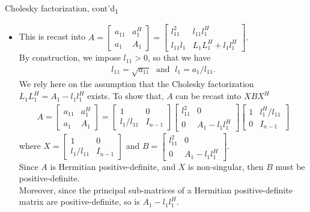 \documentclass[t,usepdftitle=false]{beamer}
\begin{document}
\begin{frame}{Cholesky factorization, cont'd\textsubscript{1}}
\begin{itemize}
\vspace{.1cm}
\item[] This is recast into 
$\displaystyle A=
\begin{bmatrix}
a_{11}&a_1^H\\
a_1&A_1
\end{bmatrix}
=
\begin{bmatrix}
l_{11}^2&l_{11}l_1^H\\
l_{11}l_1&L_1L_1^H+l_1l_1^H
\end{bmatrix}.$\vspace{.2cm}\\
By construction, we impose $l_{11}>0$, so that we have 
\begin{align*}
l_{11}=\sqrt{a_{11}}
\;\text{ and }\;l_1=a_1/l_{11}.
\end{align*}
We rely here on the assumption that the Cholesky factorization $\displaystyle L_1L_1^H=A_1-l_1l_1^H$ exists.
To show that, $A$ can be recast into $XBX^H$
\begin{align*}
A=
\begin{bmatrix}
a_{11}&a_1^H\\
a_1&A_1
\end{bmatrix}
=
\begin{bmatrix}
1&0\\
l_1/l_{11}&I_{n-1}
\end{bmatrix}
\begin{bmatrix}
l_{11}^2&0\\
0&A_1-l_1l_1^H
\end{bmatrix}
\begin{bmatrix}
1&l_1^H/ l_{11}\\
0&I_{n-1}
\end{bmatrix}
\end{align*}
where $\displaystyle X=\begin{bmatrix}1&0\\l_1/l_{11}&I_{n-1}\end{bmatrix}$ and $\displaystyle B=\begin{bmatrix}
l_{11}^2&0\\
0&A_1-l_1l_1^H
\end{bmatrix}$.\vspace{.15cm}\\
Since $A$ is Hermitian positive-definite, and $X$ is non-singular, then $B$ must be positive-definite.\\
Moreover, since the principal sub-matrices of a Hermitian positive-definite matrix are positive-definite, so is $A_1-l_1l_1^H$.
\end{itemize}
\end{frame}
\end{document}
